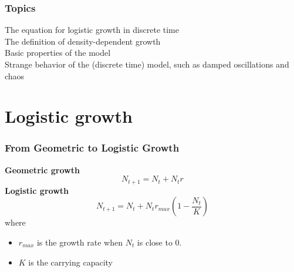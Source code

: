 \documentclass[color=usenames,dvipsnames]{beamer}\usepackage[]{graphicx}\usepackage[]{color}
\begin{document}
\begin{frame}[plain]
  \frametitle{Topics}
  \Large
  The equation for logistic growth in discrete time \\
  \pause
  \vfill
  The definition of density-dependent growth \\
  \pause
  \vfill
  Basic properties of the model \\
  \pause
  \vfill
  Strange behavior of the (discrete time) model, such as damped oscillations and chaos \\
\end{frame}



\section{Logistic growth}


\begin{frame}
  \frametitle{From Geometric to Logistic Growth}
  \large
  {\bf Geometric growth}
  \[
    N_{t+1} = N_t + N_tr
  \]
  \pause
  {\bf Logistic growth}
  \[
    N_{t+1} = N_t + N_t r_{max}\left(1 - \frac{N_t}{K}\right)
  \]
  where \\
  \begin{itemize}
    \item $r_{max}$ is the growth rate when $N_t$ is close to 0. \\
    \item $K$ is the carrying capacity
  \end{itemize}
\end{frame}
\end{document}

